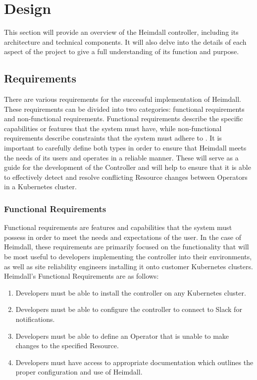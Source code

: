 \documentclass{article}
\begin{document}
\newpage

\section{Design}

This section will provide an overview of the Heimdall controller, including its architecture and technical components. It will also delve into the details of each aspect of the project to give a full understanding of its function and purpose.


\subsection{Requirements} \label{requirements}

There are various requirements for the successful implementation of Heimdall. These requirements can be divided into two categories: functional requirements and non-functional requirements. Functional requirements describe the specific capabilities or features that the system must have, while non-functional requirements describe constraints that the system must adhere to \cite{func-vs-nonfunc}. It is important to carefully define both types in order to ensure that Heimdall meets the needs of its users and operates in a reliable manner. These will serve as a guide for the development of the Controller and will help to ensure that it is able to effectively detect and resolve conflicting Resource changes between Operators in a Kubernetes cluster.


\subsubsection{Functional Requirements}

Functional requirements are features and capabilities that the system must possess in order to meet the needs and expectations of the user. In the case of Heimdall, these requirements are primarily focused on the functionality that will be most useful to developers implementing the controller into their environments, as well as site reliability engineers installing it onto customer Kubernetes clusters. Heimdall's Functional Requirements are as follows:

\begin{enumerate}
    \itemsep0em
    \item Developers must be able to install the controller on any Kubernetes cluster.
    \item Developers must be able to configure the controller to connect to Slack for notifications.
    \item Developers must be able to define an Operator that is unable to make changes to the specified Resource.
    \item Developers must have access to appropriate documentation which outlines the proper configuration and use of Heimdall.
\end{enumerate}
\end{document}
